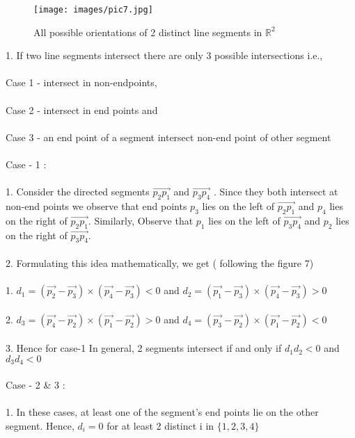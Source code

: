 \documentclass{article}
\begin{document}
    \begin{figure}[h]
    \caption{All possible orientations of 2 distinct line segments in $\mathbb{R}^{2}$}
    \centering
    \texttt{[image: images/pic7.jpg]}
    \end{figure}

    1. If two line segments intersect there are only 3 possible intersections i.e., \\ \\
    Case 1 - intersect in non-endpoints, \\ \\
    Case 2 - intersect in end points and \\ \\
    Case 3 - an end point of a segment intersect non-end point of other segment \\ \\ 
    Case - 1 : \\ \\
    1. Consider the directed segments $\Vec{p_{2}p_{1}}$ and $\Vec{p_{3}p_{4}}$ . Since they both intersect at non-end points we observe that end points $p_{3}$ lies on the left of $\Vec{p_{2}p_{1}}$ and $p_{4}$ lies on the right of $\Vec{p_{2}p_{1}}$. Similarly, Observe that $p_{1}$ lies on the left of $\Vec{p_{3}p_{4}}$ and $p_{2}$ lies on the right of $\Vec{p_{3}p_{4}}$. \\ \\
    2. Formulating this idea mathematically, we get ( following the figure 7)\\ \\
        1. $ d_{1} = (\Vec{p_{2}}-\Vec{p_{3}}) \times (\Vec{p_{4}}-\Vec{p_{3}}) < 0 $ and $ d_{2}=(\Vec{p_{1}}-\Vec{p_{3}}) \times (\Vec{p_{4}}-\Vec{p_{3}}) > 0 $ \\ \\
        2. $ d_{3} = (\Vec{p_{4}}-\Vec{p_{2}}) \times (\Vec{p_{1}}-\Vec{p_{2}}) > 0 $ and $ d_{4}=(\Vec{p_{3}}-\Vec{p_{2}}) \times (\Vec{p_{1}}-\Vec{p_{2}}) < 0 $ \\ \\
    3. Hence for case-1 In general, 2 segments intersect if and only if $d_{1} d_{2} < 0$ and $d_{3} d_{4} < 0$ \\ \\
    Case - 2 \& 3 : \\ \\
    1. In these cases, at least one of the segment's end points lie on the other segment. Hence, $d_{i}=0$ for at least 2 distinct i in $\{1,2,3,4\}$ \\ \\
\end{document}
